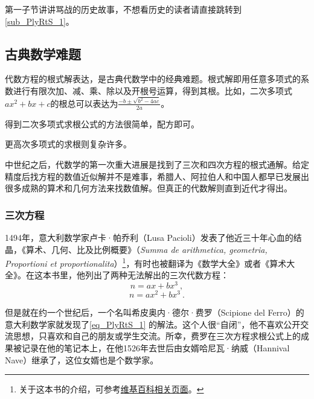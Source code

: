 




第一子节讲讲骂战的历史故事，不想看历史的读者请直接跳转到\autoref{sub_PlyRtS_1}。

\subsection{古典数学难题}

代数方程的根式解表达，是古典代数学中的经典难题。根式解即用任意多项式的系数进行有限次加、减、乘、除以及开根号运算，得到其根。比如，二次多项式$ax^2+bx+c$的根总可以表达为$\frac{-b\pm\sqrt{b^2-4ac}}{2a}$。

得到二次多项式求根公式的方法很简单，配方即可。

更高次多项式的求根则复杂许多。

中世纪之后，代数学的第一次重大进展是找到了三次和四次方程的根式通解。给定精度后找方程的数值近似解并不是难事，希腊人、阿拉伯人和中国人都早已发展出很多成熟的算术和几何方法来找数值解。但真正的代数解则直到近代才得出。

\subsubsection{三次方程}

1494年，意大利数学家卢卡·帕乔利（Lusa Pacioli）发表了他近三十年心血的结晶，《算术、几何、比及比例概要》（\textsl{Summa de arithmetica, geometria, Proportioni et proportionalita}）\footnote{关于这本书的介绍，可参考\href{https://en.wikipedia.org/wiki/Summa_de_arithmetica}{维基百科相关页面}。}，有时也被翻译为《数学大全》或者《算术大全》。在这本书里，他列出了两种无法解出的三次代数方程：
\begin{equation}\label{eq_PlyRtS_1}
n=ax+bx^3~,
\end{equation}
\begin{equation}\label{eq_PlyRtS_2}
n=ax^2+bx^3~.
\end{equation}

但是就在约一个世纪后，一个名叫希皮奥内·德尔·费罗（Scipione del Ferro）的意大利数学家就发现了\autoref{eq_PlyRtS_1} 的解法。这个人很“自闭”，他不喜欢公开交流思想，只喜欢和自己的朋友或学生交流。所幸，费罗在三次方程求根公式上的成果被记录在他的笔记本上，在他1526年去世后由女婿哈尼瓦·纳威（Hannival Nave）继承了，这位女婿也是个数学家。

